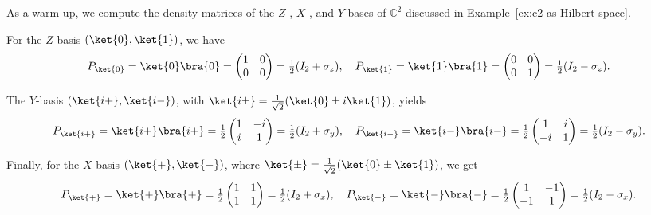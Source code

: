 \documentclass[a4paper,oneside, 12pt]{amsart}
\begin{document}
\begin{example}\label{ex:density-matrices-of-some-bases}
  As a warm-up, we compute the density matrices of the \( Z \)-, \( X \)-, and \( Y \)-bases of \( \mathbb{C}^2 \) discussed in Example~\ref{ex:c2-as-Hilbert-space}.

  For the \( Z \)-basis \( (\ket{0}, \ket{1}) \), we have
  \begin{equation*}
    P_{\ket{0}} = \ket{0}\bra{0} = \begin{pmatrix} 1 & 0 \\ 0 & 0 \end{pmatrix} = \tfrac{1}{2}(I_2 + \sigma_z), \quad
    P_{\ket{1}} = \ket{1}\bra{1} = \begin{pmatrix} 0 & 0 \\ 0 & 1 \end{pmatrix} = \tfrac{1}{2}(I_2 - \sigma_z).
  \end{equation*}

  The \( Y \)-basis \( (\ket{i+}, \ket{i-}) \), with \( \ket{i\pm} = \frac{1}{\sqrt{2}}(\ket{0} \pm i\ket{1}) \), yields
  \begin{equation*}
    P_{\ket{i+}} = \ket{i+}\bra{i+} = \tfrac{1}{2} \begin{pmatrix} 1 & -i \\ i & 1 \end{pmatrix} = \tfrac{1}{2}(I_2 + \sigma_y), \quad
    P_{\ket{i-}} = \ket{i-}\bra{i-} = \tfrac{1}{2} \begin{pmatrix} 1 & i \\ -i & 1 \end{pmatrix} = \tfrac{1}{2}(I_2 - \sigma_y).
  \end{equation*}


  Finally, for the \( X \)-basis \( (\ket{+}, \ket{-}) \), where \( \ket{\pm} = \frac{1}{\sqrt{2}}(\ket{0} \pm \ket{1}) \), we get
  \begin{equation*}
    P_{\ket{+}} = \ket{+}\bra{+} = \tfrac{1}{2} \begin{pmatrix} 1 & 1 \\ 1 & 1 \end{pmatrix} = \tfrac{1}{2}(I_2 + \sigma_x), \quad
    P_{\ket{-}} = \ket{-}\bra{-} = \tfrac{1}{2} \begin{pmatrix} 1 & -1 \\ -1 & 1 \end{pmatrix} = \tfrac{1}{2}(I_2 - \sigma_x).
  \end{equation*}
\end{example}
\end{document}
